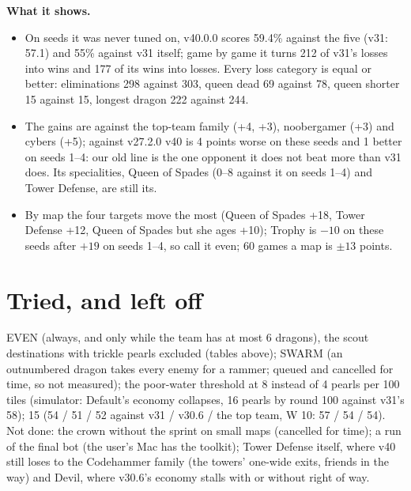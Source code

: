 \documentclass[11pt,a4paper]{article}
\newcommand{\code}[1]{\texttt{\detokenize{#1}}}
\begin{document}
\textbf{What it shows.}
\begin{itemize}
  \item On seeds it was never tuned on, v40.0.0 scores 59.4\% against the five (v31: 57.1) and 55\% against v31 itself;
        game by game it turns 212 of v31's losses into wins and 177 of its wins into losses. Every loss category is equal
        or better: eliminations 298 against 303, queen dead 69 against 78, queen shorter 15 against 15, longest dragon
        222 against 244.
  \item The gains are against the top-team family (+4, +3), noobergamer (+3) and cybers (+5); against v27.2.0 v40 is
        4 points worse on these seeds and 1 better on seeds 1--4: our old line is the one opponent it does not beat more
        than v31 does. Its specialities, Queen of Spades (0--8 against it on seeds 1--4) and Tower Defense, are still its.
  \item By map the four targets move the most (Queen of Spades +18, Tower Defense +12, Queen of Spades but she ages
        +10); Trophy is $-10$ on these seeds after $+19$ on seeds 1--4, so call it even; 60 games a map is $\pm13$ points.
\end{itemize}


\section{Tried, and left off}
EVEN (always, and only while the team has at most 6 dragons), the scout destinations with trickle pearls excluded
(tables above); SWARM (an outnumbered dragon takes every enemy for a rammer; queued and cancelled for time, so not measured);
the poor-water threshold at 8 instead of 4 pearls per 100 tiles (simulator: Default's economy collapses, 16 pearls by round
100 against v31's 58); \code{FORAGE_W} 15 (54 / 51 / 52 against v31 / v30.6 / the top team, W 10: 57 / 54 / 54). Not done: the crown without the sprint on small maps (cancelled for
time); a \code{--sandbox} run of the final bot (the user's Mac has the toolkit); Tower Defense itself, where v40 still
loses to the Codehammer family (the towers' one-wide exits, friends in the way) and Devil, where v30.6's economy stalls
with or without right of way.
\end{document}
